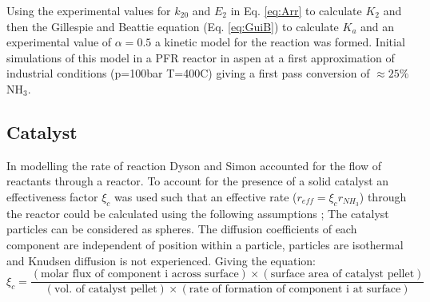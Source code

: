 Using the experimental values for $k_{20}$ and $E_2$ in Eq. \ref{eq:Arr} to calculate $K_2$ and then the Gillespie and Beattie equation (Eq. \ref{eq:GuiB}) to calculate $K_a$ and an experimental value of $\alpha = 0.5$ a kinetic model for the reaction was formed. Initial simulations of this model in a PFR reactor in aspen at a first approximation of industrial conditions (p=100bar T=400\textdegree C) giving a first pass conversion of $\approx25\% $ NH$_3$.

\subsection{Catalyst}

In modelling the rate of reaction Dyson and Simon accounted for the flow of reactants through a reactor. To account for the presence of a solid catalyst an effectiveness factor $\xi_{c}$ was used such that an effective rate ($r_{eff}=\xi_{c}r_{NH_3}$) through the reactor could be calculated using the following assumptions \cite{Dyson1968}; The catalyst particles can be considered as spheres. The diffusion coefficients of each component are independent of position within a particle, particles are isothermal and Knudsen diffusion is not experienced. Giving the equation:
\begin{equation}
	\xi_{c} = \frac{(\text{molar flux of component i across surface})\times(\text{surface area of catalyst pellet})}{(\text{vol. of catalyst pellet})\times(\text{rate of formation of component i at surface})}
\end{equation}

